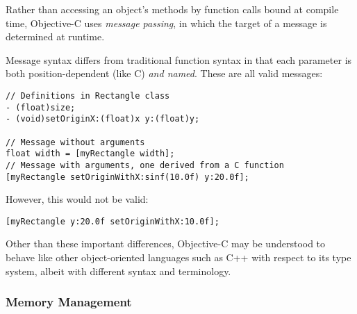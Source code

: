 Rather than accessing an object's methods by function
calls bound at compile time, Objective-C uses \emph{message passing}, in which
the target of a message is determined at runtime.

Message syntax differs from traditional function syntax in that each parameter
is both position-dependent (like C) \emph{and named}. These are all valid
messages:

\begin{verbatim}
// Definitions in Rectangle class
- (float)size;
- (void)setOriginX:(float)x y:(float)y;

// Message without arguments
float width = [myRectangle width];
// Message with arguments, one derived from a C function
[myRectangle setOriginWithX:sinf(10.0f) y:20.0f];
\end{verbatim}

However, this would not be valid:

\begin{verbatim}
[myRectangle y:20.0f setOriginWithX:10.0f];
\end{verbatim}

Other than these important differences, Objective-C may be understood to behave
like other object-oriented languages such as C++ with respect to its type
system, albeit with different syntax and terminology.

\subsubsection{Memory Management}
\label{sect:objc_memory}

